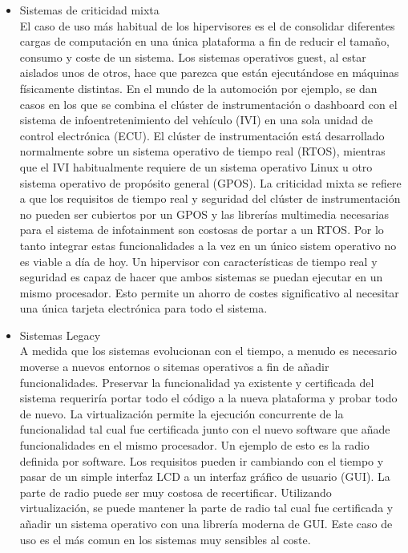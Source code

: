 \begin{itemize}
	\item Sistemas de criticidad mixta\\
	El caso de uso más habitual de los hipervisores es el de consolidar diferentes cargas de computación en una única
	plataforma a fin de reducir el tamaño, consumo y coste de un sistema. Los sistemas operativos guest, al estar aislados unos de otros, hace que parezca que están ejecutándose en máquinas físicamente distintas. En el mundo de la automoción por ejemplo,
	se dan casos en los que se combina el clúster de instrumentación o dashboard con el sistema de infoentretenimiento del vehículo (\acrshort{IVI}) en una sola unidad de control electrónica (ECU). El clúster de instrumentación está desarrollado normalmente sobre un sistema operativo de tiempo real (\acrshort{RTOS}), mientras que el \acrshort{IVI} habitualmente requiere de un sistema operativo Linux u otro sistema operativo de propósito general (\acrshort{GPOS}). La criticidad mixta se refiere a que los requisitos de tiempo real y seguridad del clúster de instrumentación no pueden ser cubiertos por un \acrshort{GPOS} y las librerías multimedia necesarias para el sistema de infotainment son costosas de portar a un \acrshort{RTOS}. Por lo tanto integrar estas funcionalidades a la vez en un único sistem operativo no es viable a día de hoy. Un hipervisor con características de tiempo real y seguridad es capaz de hacer que ambos sistemas se puedan ejecutar en un mismo procesador. Esto permite un ahorro de costes significativo al necesitar una única tarjeta electrónica para todo el sistema.
	\item Sistemas Legacy\\
	A medida que los sistemas evolucionan con el tiempo, a menudo es necesario moverse a nuevos entornos o sitemas operativos a fin de añadir funcionalidades. Preservar la funcionalidad ya existente y certificada del sistema requeriría portar todo el código a la nueva plataforma y probar todo de nuevo. La virtualización permite la ejecución concurrente de la funcionalidad tal cual fue certificada junto con el nuevo software que añade funcionalidades en el mismo procesador. Un ejemplo de esto es la radio definida por software. Los requisitos pueden ir cambiando con el tiempo y pasar de un simple interfaz \acrshort{LCD} a un interfaz gráfico de usuario (\acrshort{GUI}). La parte de radio puede ser muy costosa de recertificar. Utilizando virtualización, se puede mantener la parte de radio tal cual fue certificada y añadir un sistema operativo con una librería moderna de \acrshort{GUI}.
	Este caso de uso es el más comun en los sistemas muy sensibles al coste.\\[1cm]
\end{itemize}
